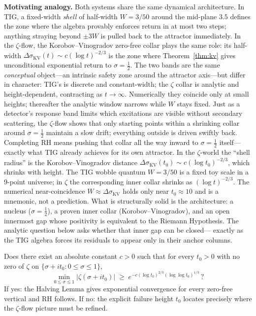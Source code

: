 \documentclass[11pt]{article}
\begin{document}
\medskip\noindent\textbf{Motivating analogy.}
Both systems share the same dynamical architecture.
In TIG, a fixed-width \emph{shell} of half-width $W=3/50$ around the
mid-plane $3.5$ defines the zone where the algebra provably enforces
return in at most two steps; anything straying beyond $\pm 3W$ is pulled
back to the attractor immediately.
In the $\zeta$-flow, the Korobov--Vinogradov zero-free collar plays the
same role: its half-width $\Delta\sigma_{\mathrm{KV}}(t)\sim
c(\log t)^{-2/3}$ is the zone where Theorem~\ref{thm:kv} gives
unconditional exponential return to $\sigma=\tfrac12$.
The two bands are the same \emph{conceptual} object—an intrinsic safety
zone around the attractor axis—but differ in character: TIG's is discrete
and constant-width; the $\zeta$ collar is analytic and height-dependent,
contracting as $t\to\infty$.
Numerically they coincide only at small heights; thereafter the analytic
window narrows while $W$ stays fixed.
Just as a detector's response band limits which excitations are visible
without secondary scattering, the $\zeta$-flow shows that only starting
points within a shrinking collar around $\sigma=\tfrac12$ maintain a slow
drift; everything outside is driven swiftly back.
Completing RH means pushing that collar all the way inward to
$\sigma=\tfrac12$ itself—exactly what TIG already achieves for its own
attractor.
In the $\zeta$-world the ``shell radius'' is the Korobov--Vinogradov
distance $\Delta\sigma_{\mathrm{KV}}(t_0)\sim c(\log t_0)^{-2/3}$,
which shrinks with height.
The TIG wobble quantum $W=3/50$ is a fixed toy scale in a 9-point
universe; in $\zeta$ the corresponding inner collar shrinks as
$(\log t)^{-2/3}$.
The numerical near-coincidence $W\approx\Delta\sigma_{\mathrm{KV}}$
holds only near $t_0\approx10$ and is a mnemonic, not a prediction.
What is structurally solid is the architecture: a nucleus ($\sigma=\tfrac12$),
a proven inner collar (Korobov--Vinogradov), and an open innermost gap
whose positivity is equivalent to the Riemann Hypothesis.
The analytic question below asks whether that inner gap can be closed—
exactly as the TIG algebra forces its residuals to appear only in their
anchor columns.

\medskip
\begin{tcolorbox}[colback=blue!5,colframe=black!70,
  title={The analytic open problem (one line)}]
Does there exist an absolute constant $c>0$ such that for every $t_0>0$
with no zero of $\zeta$ on $\{{\sigma+it_0:0\le\sigma\le1}\}$,
\begin{equation}\label{eq:open}
  \min_{0\le\sigma\le1}|\zeta(\sigma+it_0)|
  \;\ge\;
  e^{-c(\log t_0)^{2/3}(\log\log t_0)^{1/3}}\,?
\end{equation}
If yes: the Halving Lemma gives exponential convergence for every
zero-free vertical and RH follows.
If no: the explicit failure height $t_0$ locates precisely where the
$\zeta$-flow picture must be refined.
\end{tcolorbox}
\medskip
\end{document}
